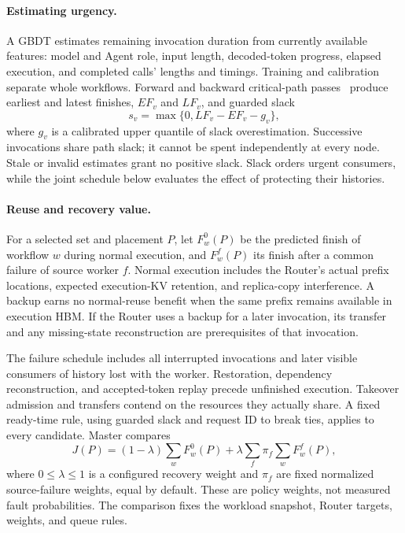 \paragraph{Estimating urgency.}
A GBDT estimates remaining invocation duration from currently available
features: model and Agent role, input length, decoded-token progress,
elapsed execution, and completed calls' lengths and timings. Training
and calibration separate whole workflows. Forward and backward
critical-path passes~\cite{kelley1959cpm} produce earliest and latest
finishes, $EF_v$ and $LF_v$, and guarded slack
\begin{equation}
 s_v=\max\{0,LF_v-EF_v-g_v\},
 \label{eq:teacher-slack}
\end{equation}
where $g_v$ is a calibrated upper quantile of slack overestimation.
Successive invocations share path slack; it cannot be spent independently
at every node. Stale or invalid estimates grant no positive slack.
Slack orders urgent consumers, while the joint schedule below evaluates
the effect of protecting their histories.

\paragraph{Reuse and recovery value.}
For a selected set and placement $P$, let $F_w^0(P)$ be the predicted
finish of workflow $w$ during normal execution, and $F_w^f(P)$ its finish
after a common failure of source worker $f$. Normal execution includes
the Router's actual prefix locations, expected execution-KV retention,
and replica-copy interference. A backup earns no normal-reuse benefit
when the same prefix remains available in execution HBM. If the Router
uses a backup for a later invocation, its transfer and any missing-state
reconstruction are prerequisites of that invocation.

The failure schedule includes all interrupted invocations and later
visible consumers of history lost with the worker. Restoration,
dependency reconstruction, and accepted-token replay precede unfinished
execution. Takeover admission and transfers contend on the resources
they actually share. A fixed ready-time rule, using guarded slack and
request ID to break ties, applies to every candidate. Master compares
\begin{equation}
 J(P)=(1-\lambda)\sum_w F_w^0(P)
       +\lambda\sum_f\pi_f\sum_w F_w^f(P),
 \label{eq:teacher-objective}
\end{equation}
where $0\le\lambda\le1$ is a configured recovery weight and $\pi_f$ are
fixed normalized source-failure weights, equal by default. These are
policy weights, not measured fault probabilities. The comparison fixes
the workload snapshot, Router targets, weights, and queue rules.

